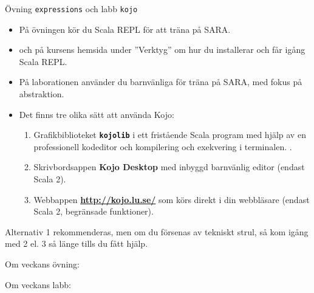 
\begin{Slide}{Övning \texttt{expressions} och labb \texttt{kojo}}
\label{w01:kojo-slide}
\begin{itemize}
  \item På övningen kör du Scala REPL för att träna på SARA.
  \item[]  och på kursens hemsida under ''Verktyg'' om hur du installerar och får igång Scala REPL.
  \item På laborationen använder du barnvänliga  för träna på SARA, med fokus på abstraktion.
  \item Det finns tre olika sätt att använda Kojo:
  \begin{enumerate}
  \item Grafikbiblioteket \textbf{\texttt{kojolib}} i ett fristående Scala program med hjälp av en professionell kodeditor och kompilering och exekvering i terminalen. .
  \item Skrivbordsappen \textbf{Kojo Desktop} med inbyggd barnvänlig editor (endast Scala 2).
  \item Webbappen \textbf{\url{http://kojo.lu.se/}} som körs direkt i din webbläsare (endast Scala 2, begränsade funktioner).
  \end{enumerate}
\end{itemize}  
Alternativ 1 rekommenderas, men om du försenas av tekniskt strul, så kom igång med 2 el. 3 så länge tills du fått hjälp.
\end{Slide}

\ifkompendium\else

\begin{SlideExtra}{Om veckans övning: }\SlideFontSmall

\begin{itemize}

\end{itemize}

\end{SlideExtra}

\begin{SlideExtra}{Om veckans labb: }
\begin{itemize}

\end{itemize}
\end{SlideExtra}

\fi

